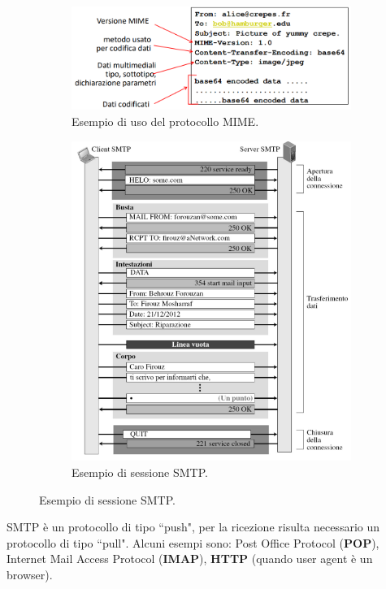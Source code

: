 \documentclass[11pt, italian, openany]{book}
\begin{document}
\begin{sloppypar}
\begin{itemize}[topsep=0pt]
	\begin{figure}[!h]
		\begin{subfigure}{0.49 \linewidth} \centering
			\includegraphics[scale=0.275]{images/smtp-mime.png}
			\caption{Esempio di uso del protocollo MIME.}
		\end{subfigure}
		\begin{subfigure}{0.49 \linewidth} \centering
			\includegraphics[scale=0.32]{images/smtp-sessione.png}
			\caption{Esempio di sessione SMTP.}
		\end{subfigure}
	\end{figure}

	SMTP \`e un protocollo di tipo ``push", per la ricezione risulta necessario un protocollo di tipo ``pull". Alcuni esempi sono: Post Office Protocol
	(\textbf{POP}), Internet Mail Access Protocol (\textbf{IMAP}), \textbf{HTTP} (quando user agent \`e un browser).


\end{itemize}
\end{sloppypar}
\end{document}
